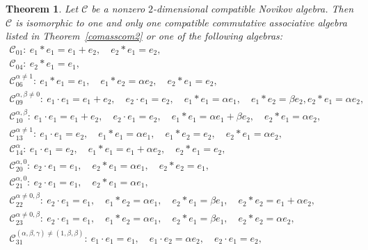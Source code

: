 \documentclass[10pt,a4paper]{amsart}
\numberwithin{equation}{section}
\newtheorem{Theorem}{Theorem}[section]
\begin{document}
\begin{Theorem}\label{comnov2}
Let $\mathcal{C}$ be a nonzero $2$-dimensional compatible Novikov algebra.
Then $\mathcal{C}$ is isomorphic to one and only one compatible commutative associative algebra listed in Theorem~{\rm\ref{comasscom2}} or one of the following algebras:
\begin{gather*}
 \mathcal{C}_{01} \colon\ e_{1} \ast e_{1} = e_{1} + e_{2},\quad e_{2} \ast e_{1} =e_{2}, \\
 \mathcal{C}_{04} \colon\ e_{2} \ast e_{1} =e_{1}, \\
 \mathcal{C}_{06}^{\alpha\neq 1} \colon\ e_{1} \ast e_{1} =e_{1}, \quad e_{1} \ast e_{2} = \alpha e_{2}, \quad e_{2} \ast e_{1} =e_{2}, \\
 \mathcal{C}_{09}^{\alpha ,\beta \neq 0} \colon\
 e_{1}\cdot e_{1}=e_{1}+e_{2} , \quad e_{2}\cdot e_{1}=e_{2} , \quad
 e_{1}\ast e_{1}=\alpha e_{1} , \quad e_{1}\ast e_{2}=\beta e_{2} , e_{2}\ast e_{1}=\alpha e_{2},
\\
 \mathcal{C}_{10}^{\alpha ,\beta } \colon\
 e_{1}\cdot e_{1}=e_{1}+e_{2} ,\quad e_{2}\cdot e_{1}=e_{2} , \quad
 e_{1}\ast e_{1}=\alpha e_{1}+\beta e_{2} , \quad e_{2}\ast e_{1}=\alpha e_{2},
\\
 \mathcal{C}_{13}^{\alpha\neq1 } \colon\
 e_{1}\cdot e_{1}=e_{2} , \quad
 e_{1}\ast e_{1}=\alpha e_{1} , \quad e_{1}\ast e_{2}=e_{2} , \quad e_{2}\ast
e_{1}=\alpha e_{2},
\\
 \mathcal{C}_{14}^{\alpha } \colon\
 e_{1}\cdot e_{1}=e_{2} , \quad
 e_{1}\ast e_{1}=e_{1}+\alpha e_{2} ,\quad e_{2}\ast e_{1}=e_{2},
\\
 \mathcal{C}_{20}^{\alpha ,0 } \colon\
 e_{2}\cdot e_{1}=e_{1} , \quad
 e_{2}\ast e_{1}=\alpha e_{1} , \quad e_{2}\ast e_{2}=e_{1},
\\
 \mathcal{C}_{21}^{\alpha ,0 } \colon\
 e_{2}\cdot e_{1}=e_{1} , \quad
 e_{2}\ast e_{1}=\alpha e_{1},
\\
 \mathcal{C}_{22}^{\alpha \neq 0,\beta } \colon\
 e_{2}\cdot e_{1}=e_{1} , \quad
 e_{1}\ast e_{2}=\alpha e_{1} , \quad e_{2}\ast e_{1}=\beta e_{1} , \quad
e_{2}\ast e_{2}=e_{1}+\alpha e_{2},
\\
 \mathcal{C}_{23}^{\alpha \neq 0,\beta } \colon\
 e_{2}\cdot e_{1}=e_{1} , \quad
 e_{1}\ast e_{2}=\alpha e_{1} , \quad e_{2}\ast e_{1}=\beta e_{1} ,\quad
e_{2}\ast e_{2}=\alpha e_{2},
\\
 \mathcal{C}_{31}^{(\alpha ,\beta ,\gamma) \neq (1,\beta,\beta) } \colon\
 e_{1}\cdot e_{1}=e_{1} , \quad e_{1}\cdot e_{2}=\alpha e_{2} , \quad e_{2}\cdot
e_{1}=e_{2} , \\

\end{gather*}
\end{Theorem}
\end{document}
